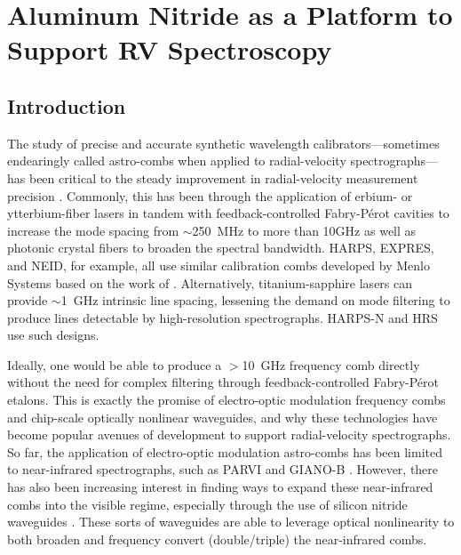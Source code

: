 \chapter{Aluminum Nitride as a Platform to Support RV Spectroscopy} \label{chapter:astro-comb}

\section{Introduction} \label{astro-comb:intro}

The study of precise and accurate synthetic wavelength calibrators---sometimes endearingly called astro-combs when applied to radial-velocity spectrographs---has been critical to the steady improvement in radial-velocity measurement precision \citep{mccracken_decade_2017}. Commonly, this has been through the application of erbium- or ytterbium-fiber lasers in tandem with feedback-controlled Fabry-P\'erot cavities to increase the mode spacing from $\sim$250~\si{\mega\hertz} to more than 10\si{\giga\hertz} as well as photonic crystal fibers to broaden the spectral bandwidth. HARPS, EXPRES, and NEID, for example, all use similar calibration combs developed by Menlo Systems based on the work of \citet{probst_laser_2014}. Alternatively, titanium-sapphire lasers can provide $\sim$1~\si{\giga\hertz} intrinsic line spacing, lessening the demand on mode filtering to produce lines detectable by high-resolution spectrographs. HARPS-N \citep{doerr_performance_2012} and HRS \citep{mccracken_wavelength_2017} use such designs.

Ideally, one would be able to produce a $>$10~\si{\giga\hertz} frequency comb directly without the need for complex filtering through feedback-controlled Fabry-P\'erot etalons. This is exactly the promise of electro-optic modulation frequency combs and chip-scale optically nonlinear waveguides, and why these technologies have become popular avenues of development to support radial-velocity spectrographs. So far, the application of electro-optic modulation astro-combs has been limited to near-infrared spectrographs, such as PARVI \citep{yi_demonstration_2016} and GIANO-B \citep{obrzud_broadband_2018}. However, there has also been increasing interest in finding ways to expand these near-infrared combs into the visible regime, especially through the use of silicon nitride waveguides \citep{carlson_ultrafast_2017, obrzud_visible_2019}. These sorts of waveguides are able to leverage optical nonlinearity to both broaden and frequency convert (double/triple) the near-infrared combs.


